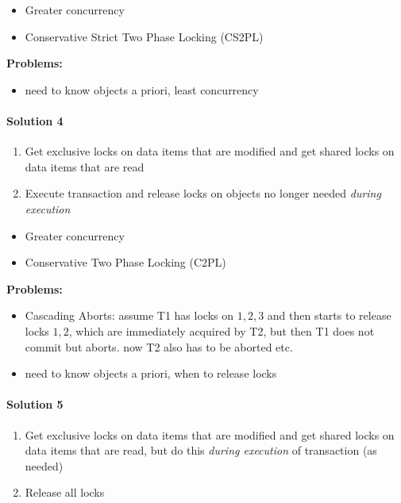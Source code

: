 \begin{itemize}
\item Greater concurrency
\item Conservative Strict Two Phase Locking (CS2PL)
\end{itemize}

\textbf{{\color{red} Problems:}}
\begin{itemize}
\item need to know objects a priori, least concurrency
\end{itemize}

\paragraph{Solution 4}
\begin{enumerate}
\item Get exclusive locks on data items that are modified and get
  shared locks on data items that are read
\item Execute transaction and release locks on objects
  no longer needed \textit{during execution}
\end{enumerate}

\begin{itemize}
\item Greater concurrency
\item Conservative Two Phase Locking (C2PL)
\end{itemize}

\textbf{{\color{red} Problems:}}
\begin{itemize}
\item Cascading Aborts: assume T1 has locks on $1,2,3$ and
  then starts to release locks $1,2$, which are immediately
  acquired by T2, but then T1 does not commit but aborts.
  now T2 also has to be aborted etc.
\item need to know objects a priori, when to release locks
\end{itemize}


\paragraph{Solution 5}
\begin{enumerate}
\item Get exclusive locks on data items that are modified and
  get shared locks on data items that are read, but do this
  \textit{during execution} of transaction (as needed)
\item Release all locks
\end{enumerate}

